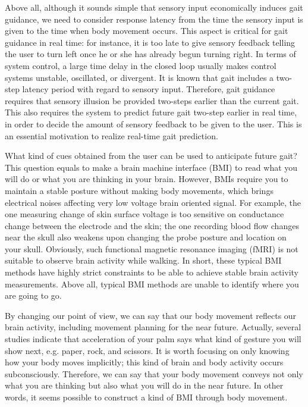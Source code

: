 \documentclass{sigchi}
\begin{document}
Above all, although it sounds simple that sensory input economically induces gait guidance, we need to consider response latency from the time the sensory input is given to the time when body movement occurs. This aspect is critical for gait guidance in real time: for instance, it is too late to give sensory feedback telling the user to turn left once he or she has already begun turning right. In terms of system control, a large time delay in the closed loop usually makes control systems unstable, oscillated, or divergent. It is known that gait includes a two-step latency period with regard to sensory input. Therefore, gait guidance requires that sensory illusion be provided two-steps earlier than the current gait. This also requires the system to predict future gait two-step earlier in real time, in order to decide the amount of sensory feedback to be given to the user. This is an essential motivation to realize real-time gait prediction.



What kind of cues obtained from the user can be used to anticipate future gait? This question equals to make a brain machine interface (BMI) to read what you will do or what you are thinking in your brain. However, BMIs require you to maintain a stable posture without making body movements, which brings electrical noises affecting very low voltage brain oriented signal\cite{PFURTSCHELLER2006145,OLNEY19859}. For example, the one measuring change of skin surface voltage is too sensitive on conductance change between the electrode and the skin; the one recording blood flow changes near the skull also weakens upon changing the probe posture and location on your skull. Obviously, such functional magnetic resonance imaging (fMRI) is not suitable to observe brain activity while walking. In short, these typical BMI methods have highly strict constraints to be able to achieve stable brain activity measurements. Above all, typical BMI methods are unable to identify  where you are going to go.

By changing our point of view, we can say that our body movement reflects\cite{VANEMMERIK19961175} our brain activity, including movement planning for the near future\cite{MORRIS1973729,ZIJLSTRA1997249}.%
 Actually, several studies indicate that acceleration of your palm says what kind of gesture you will show next, e.g. paper, rock, and scissors. It is worth focusing on only knowing how your body moves implicitly; this kind of brain and body activity occurs subconsciously. Therefore, we can say that your body movement conveys not only what you are thinking but also what you will do in the near future. In other words, it seems possible to construct a kind of BMI through body movement. 
 
\end{document}
